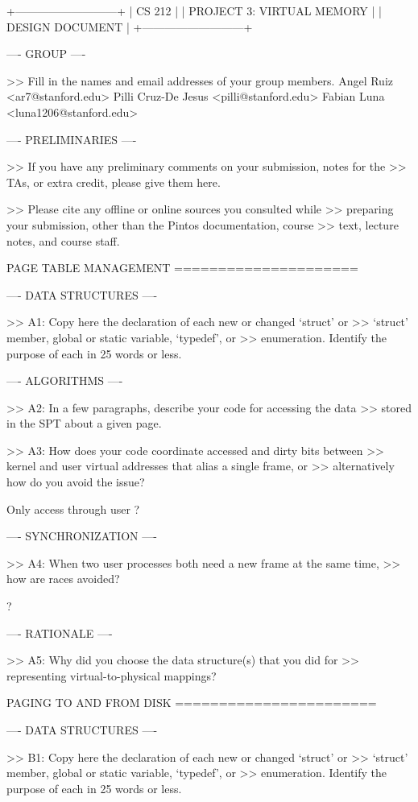             +---------------------------+
            |          CS 212           |
            | PROJECT 3: VIRTUAL MEMORY |
            |      DESIGN DOCUMENT      |
            +---------------------------+

---- GROUP ----

>> Fill in the names and email addresses of your group members.
Angel Ruiz <ar7@stanford.edu>
Pilli Cruz-De Jesus <pilli@stanford.edu>
Fabian Luna <luna1206@stanford.edu>

---- PRELIMINARIES ----

>> If you have any preliminary comments on your submission, notes for the
>> TAs, or extra credit, please give them here.

>> Please cite any offline or online sources you consulted while
>> preparing your submission, other than the Pintos documentation, course
>> text, lecture notes, and course staff.

            PAGE TABLE MANAGEMENT
            =====================

---- DATA STRUCTURES ----

>> A1: Copy here the declaration of each new or changed `struct' or
>> `struct' member, global or static variable, `typedef', or
>> enumeration.  Identify the purpose of each in 25 words or less.


---- ALGORITHMS ----

>> A2: In a few paragraphs, describe your code for accessing the data
>> stored in the SPT about a given page.

>> A3: How does your code coordinate accessed and dirty bits between
>> kernel and user virtual addresses that alias a single frame, or
>> alternatively how do you avoid the issue?

Only access through user ?

---- SYNCHRONIZATION ----

>> A4: When two user processes both need a new frame at the same time,
>> how are races avoided?

?

---- RATIONALE ----

>> A5: Why did you choose the data structure(s) that you did for
>> representing virtual-to-physical mappings?

               PAGING TO AND FROM DISK
               =======================

---- DATA STRUCTURES ----

>> B1: Copy here the declaration of each new or changed `struct' or
>> `struct' member, global or static variable, `typedef', or
>> enumeration.  Identify the purpose of each in 25 words or less.

